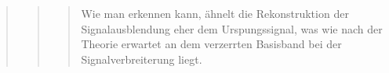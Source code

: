 \begin{quote}
\begin{quote}
\begin{quote}
             
             Wie man erkennen kann, ähnelt die Rekonstruktion der
             Signalausblendung eher dem Urspungssignal, was wie nach der Theorie
             erwartet an dem verzerrten Basisband bei der Signalverbreiterung
             liegt.
        \end{quote}

        
        
        
    \end{quote}
    
\end{quote}









%     
%         

% 
% 
% 



